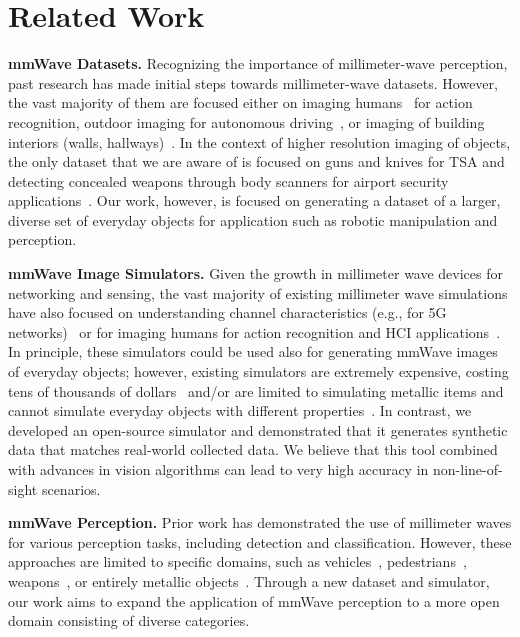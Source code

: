 
\vspace{-0.1pt}
\section{Related Work}
\vspace{-0.1pt}


\noindent \textbf{mmWave Datasets.}
Recognizing the importance of millimeter-wave perception, past research has made initial steps towards millimeter-wave datasets. However, the vast majority of them are focused either on imaging humans~\cite{human_pose, milipoint, humans_and_cars, milipoint,rahman2024mmvr, wu2024mmhpe} for action recognition, outdoor imaging for autonomous driving~\cite{multimodal_av,av1,hawkeye_haitham,coloradar,kradar,radset,view-of-delft,yang2024autonomous, wang2024vision,guan2024talk2radar}, or imaging of building interiors (walls, hallways)~\cite{brescia2024millinoise,prabhakara2023radarhd}. In the context of higher resolution imaging of objects, the only dataset that we are aware of is focused on guns and knives for TSA and detecting concealed weapons through body scanners for airport security applications~\cite{human_concealed, concealed_class_1,SquiggleMilli}. Our work, however, is focused on generating a dataset of a larger, diverse set of everyday objects for application such as robotic manipulation and perception. 


\vspace{0.03in}
\noindent \textbf{mmWave Image Simulators.}
Given the growth in millimeter wave devices for networking and sensing, the vast majority of existing millimeter wave simulations have also focused on understanding channel characteristics (e.g., for 5G networks)~\cite{ansys,ChanSim2,ChanSim1} or for imaging humans for action recognition and HCI applications~\cite{hsim_1,hsim_2,hsim_3}. In principle, these simulators could be used also for generating mmWave images of everyday objects; however, existing simulators are extremely expensive, costing tens of thousands of dollars~\cite{ansys} and/or are limited to simulating metallic items and cannot simulate everyday objects with different properties~\cite{SquiggleMilli}. In contrast, we developed an open-source simulator and demonstrated that it generates synthetic data that matches real-world collected data. We believe that this tool combined with advances in vision algorithms can lead to very high accuracy in non-line-of-sight scenarios.


\vspace{0.03in}
\noindent \textbf{mmWave Perception.}
Prior work has demonstrated the use of millimeter waves for various perception tasks, including detection and classification. However, these approaches are limited to specific domains, such as vehicles~\cite{human_detect_av, hawkeye_haitham, car_completion}, pedestrians~\cite{ped_classification}, weapons~\cite{concealed_class_1, concealed_class_2}, or entirely metallic objects~\cite{obj_in_box}. Through a new dataset and simulator, our work aims to expand the application of mmWave perception to a more open domain consisting of diverse categories.